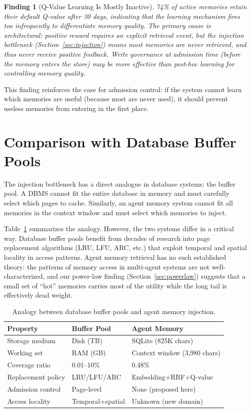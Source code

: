 \documentclass[10pt,twocolumn]{article}
\newtheorem{finding}{Finding}
\begin{document}
\begin{finding}[Q-Value Learning Is Mostly Inactive]
74\% of active memories retain their default Q-value after 30 days, indicating that the learning mechanism fires too infrequently to differentiate memory quality. The primary cause is architectural: positive reward requires an explicit retrieval event, but the injection bottleneck (Section~\ref{sec:injection}) means most memories are never retrieved, and thus never receive positive feedback. Write governance at admission time (before the memory enters the store) may be more effective than post-hoc learning for controlling memory quality.
\end{finding}

This finding reinforces the case for admission control: if the system cannot learn which memories are useful (because most are never used), it should prevent useless memories from entering in the first place.

\section{Comparison with Database Buffer Pools}
\label{sec:bufferpool}

The injection bottleneck has a direct analogue in database systems: the buffer pool. A DBMS cannot fit the entire database in memory and must carefully select which pages to cache. Similarly, an agent memory system cannot fit all memories in the context window and must select which memories to inject.

Table~\ref{tab:analogy} summarizes the analogy. However, the two systems differ in a critical way. Database buffer pools benefit from decades of research into page replacement algorithms (LRU, LFU, ARC, etc.) that exploit temporal and spatial locality in access patterns. Agent memory retrieval has no such established theory: the patterns of memory access in multi-agent systems are not well-characterized, and our power-law finding (Section~\ref{sec:powerlaw}) suggests that a small set of ``hot'' memories carries most of the utility while the long tail is effectively dead weight.

\begin{table}[h]
\centering
\caption{Analogy between database buffer pools and agent memory injection.}
\label{tab:analogy}
\begin{tabular}{lll}
\toprule
Property & Buffer Pool & Agent Memory \\
\midrule
Storage medium & Disk (TB) & SQLite (825K chars) \\
Working set & RAM (GB) & Context window (3,980 chars) \\
Coverage ratio & 0.01--10\% & 0.48\% \\
Replacement policy & LRU/LFU/ARC & Embedding+RRF+Q-value \\
Admission control & Page-level & None (proposed here) \\
Access locality & Temporal+spatial & Unknown (new domain) \\
\bottomrule
\end{tabular}
\end{table}
\end{document}
